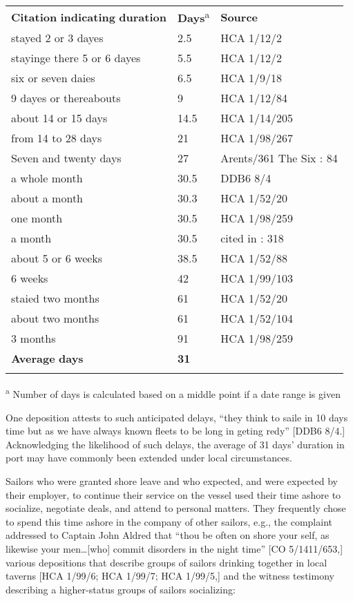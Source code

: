 \tabletail{}
\tablelasttail{}
\begin{tabularx}{\textwidth}{XXX}

\lsptoprule

\textbf{Citation} \textbf{indicating} \textbf{duration} & \textbf{Days}\textsuperscript{a} & \textbf{Source}\\
 stayed 2 or 3 dayes & 2.5 & HCA 1/12/2\\
stayinge there 5 or 6 dayes & 5.5 & HCA 1/12/2\\
six or seven daies & 6.5 & HCA 1/9/18\\
9 dayes or thereabouts & 9 & HCA 1/12/84\\
about 14 or 15 days & 14.5 & HCA 1/14/205\\
from 14 to 28 days & 21 & HCA 1/98/267\\
Seven and twenty days & 27 & Arents/361 The Six \citealt{Voyages1678}: 84\\
a whole month & 30.5 & DDB6 8/4\\
about a month & 30.3 & HCA 1/52/20\\
one month & 30.5 & HCA 1/98/259\\
a month & 30.5 & cited in \citealt{Bicheno2012}: 318\\
about 5 or 6 weeks & 38.5 & HCA 1/52/88\\
6 weeks & 42 & HCA 1/99/103\\
staied two months & 61 & HCA 1/52/20\\
about two months & 61 & HCA 1/52/104\\
3 months & 91 & HCA 1/98/259\\
\raggedleft \textbf{Average} \textbf{days} & \textbf{31} & \\
\lspbottomrule
\end{tabularx}
\textsuperscript{a}\textbf{\textsuperscript{} }Number of days is calculated based on a middle point if a date range is given 

One deposition attests to such anticipated delays, “they think to saile in 10 days time but as we have always known fleets to be long in geting redy” [DDB6 8/4.] Acknowledging the likelihood of such delays, the average of 31 days’ duration in port may have commonly been extended under local circumstances.

  Sailors who were granted shore leave and who expected, and were expected by their employer, to continue their service on the vessel used their time ashore to socialize, negotiate deals, and attend to personal matters. They frequently chose to spend this time ashore in the company of other sailors, e.g., the complaint addressed to Captain John Aldred that “thou be often on shore your self, as likewise your men…[who] commit disorders in the night time” [CO 5/1411/653,] various depositions that describe groups of sailors drinking together in local taverns [HCA 1/99/6; HCA 1/99/7; HCA 1/99/5,] and the witness testimony describing a higher-status groups of sailors socializing:

